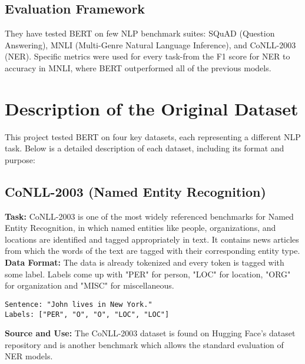 \documentclass{article}
\begin{document}
\subsection{Evaluation Framework}
They have tested BERT on few NLP benchmark suites: SQuAD (Question Answering), MNLI (Multi-Genre Natural Language Inference), and CoNLL-2003 (NER). Specific metrics were used for every task-from the F1 score for NER to accuracy in MNLI, where BERT outperformed all of the previous models.

\section{Description of the Original Dataset}
This project tested BERT on four key datasets, each representing a different NLP task. Below is a detailed description of each dataset, including its format and purpose:

\subsection{CoNLL-2003 (Named Entity Recognition)}
\textbf{Task:} CoNLL-2003 is one of the most widely referenced benchmarks for Named Entity Recognition, in which named entities like people, organizations, and locations are identified and tagged appropriately in text. It contains news articles from which the words of the text are tagged with their corresponding entity type.\\
\textbf{Data Format:} The data is already tokenized and every token is tagged with some label. Labels come up with "PER" for person, "LOC" for location, "ORG" for organization and "MISC" for miscellaneous.

\begin{verbatim}
Sentence: "John lives in New York."
Labels: ["PER", "O", "O", "LOC", "LOC"]
\end{verbatim}
\textbf{Source and Use:} The CoNLL-2003 dataset is found on Hugging Face's dataset repository and is another benchmark which allows the standard evaluation of NER models.
\end{document}
